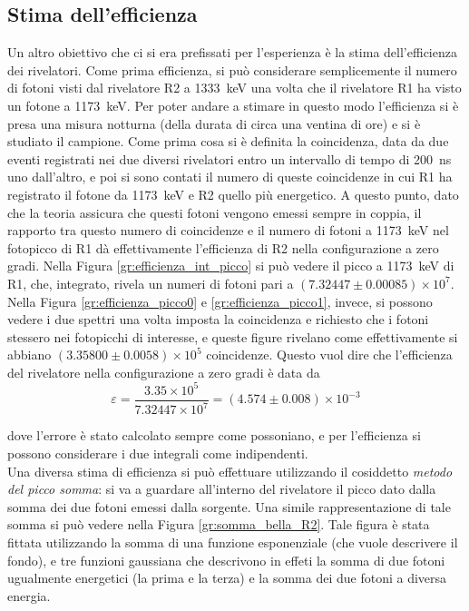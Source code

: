 \subsection{Stima dell'efficienza}
Un altro obiettivo che ci si era prefissati per l'esperienza è la stima dell'efficienza dei rivelatori. Come prima efficienza, si può considerare semplicemente il numero
di fotoni visti dal rivelatore R2 a 1333~keV una volta che il rivelatore R1 ha visto un fotone a 1173~keV. Per poter andare a stimare in questo modo l'efficienza si è presa
una misura notturna (della durata di circa una ventina di ore) e si è studiato il campione. Come prima cosa si è definita la coincidenza, data da due eventi
registrati nei due diversi rivelatori entro un intervallo di tempo di 200~ns uno dall'altro, e poi si sono contati il numero di queste coincidenze in cui R1 ha registrato
il fotone da 1173~keV e R2 quello più energetico. A questo punto, dato che la teoria assicura che questi fotoni vengono emessi sempre in coppia, il rapporto tra questo
numero di coincidenze e il numero di fotoni a 1173~keV nel fotopicco di R1 dà effettivamente l'efficienza di R2 nella configurazione a zero gradi. Nella
Figura \ref{gr:efficienza_int_picco} si può vedere il picco a 1173~keV di R1, che, integrato, rivela un numeri di fotoni pari a $(7.32447 \pm 0.00085)\times 10^7$.
Nella Figura \ref{gr:efficienza_picco0} e \ref{gr:efficienza_picco1}, invece, si possono vedere i due spettri una volta imposta la coincidenza e richiesto che i fotoni stessero
nei fotopicchi di interesse, e queste figure rivelano come effettivamente si abbiano $(3.35800 \pm 0.0058)\times 10^5$ coincidenze. Questo vuol dire che l'efficienza del rivelatore nella configurazione
a zero gradi è data da
$$\varepsilon=\frac{3.35\times 10^5}{7.32447 \times 10^7}=(4.574 \pm 0.008)\times 10^{-3}$$



dove l'errore è stato calcolato sempre come possoniano, e per l'efficienza si possono considerare i due integrali come indipendenti.\\

\FloatBarrier
Una diversa stima di efficienza si può effettuare utilizzando il cosiddetto \textit{metodo del picco somma}: si va a guardare all'interno del rivelatore il picco dato dalla 
somma dei due fotoni emessi dalla sorgente. Una simile rappresentazione di tale somma si può vedere nella Figura \ref{gr:somma_bella_R2}. Tale figura è stata fittata 
utilizzando la somma di una funzione esponenziale (che vuole descrivere il fondo), e tre funzioni gaussiana che descrivono in effeti la somma di due fotoni ugualmente energetici
(la prima e la terza) e la somma dei due fotoni a diversa energia.\\



